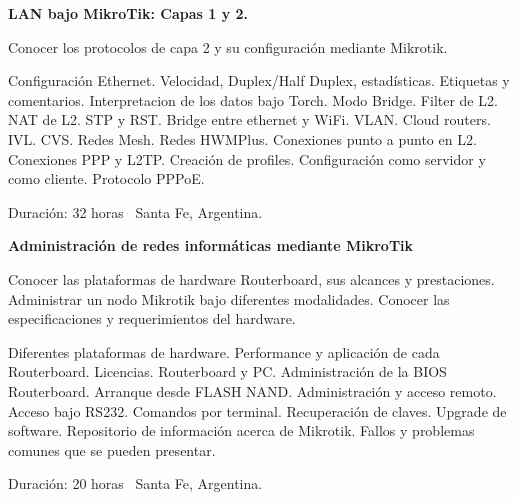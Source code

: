 \documentclass[letterpaper,MMMyyyy,nonstop]{simpleresumecv}
\begin{document}
\begin{body}
\textbf{LAN bajo MikroTik: Capas 1 y 2.}
\hfill
{}

\BulletItem Conocer los protocolos de capa 2 y su configuración mediante Mikrotik.

\begin{detail}
	\SubBulletItem 
	Configuración Ethernet. Velocidad, Duplex/Half Duplex, estadísticas. Etiquetas y comentarios. Interpretacion de los datos bajo Torch. Modo Bridge.  Filter de L2. NAT de L2. STP y RST. Bridge entre ethernet y WiFi. VLAN. Cloud routers. IVL. CVS. Redes Mesh. Redes HWMPlus. Conexiones punto a punto en L2. Conexiones  PPP y L2TP.  Creación de profiles.  Configuración como servidor y como cliente. Protocolo PPPoE.
\end{detail}
Duración: 32 horas \SubBulletSymbol\, Santa Fe, Argentina.


\BigGap
\textbf{Administración de redes informáticas mediante MikroTik}
\hfill
{}

\BulletItem Conocer las plataformas de hardware Routerboard, sus alcances y prestaciones. Administrar un nodo Mikrotik bajo diferentes modalidades. Conocer las especificaciones y requerimientos del hardware.
\begin{detail}
	\SubBulletItem 
	Diferentes plataformas de hardware. Performance y aplicación de cada Routerboard. Licencias. Routerboard y PC. Administración de la BIOS Routerboard. Arranque desde FLASH NAND. Administración y acceso remoto. Acceso bajo RS232. Comandos por terminal. Recuperación de claves. Upgrade de software. Repositorio de información acerca de Mikrotik. Fallos y problemas comunes que se pueden presentar.
\end{detail}
Duración: 20 horas \SubBulletSymbol\, Santa Fe, Argentina.




\end{body}
\end{document}
